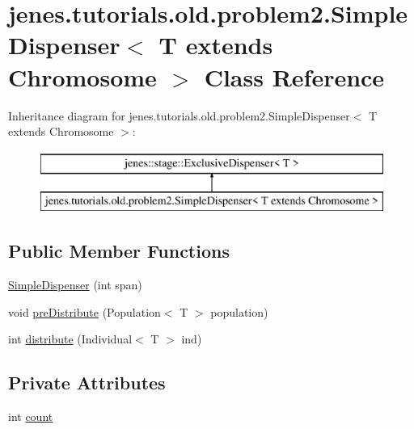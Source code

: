\hypertarget{classjenes_1_1tutorials_1_1old_1_1problem2_1_1_simple_dispenser_3_01_t_01extends_01_chromosome_01_4}{\section{jenes.\-tutorials.\-old.\-problem2.\-Simple\-Dispenser$<$ T extends Chromosome $>$ Class Reference}
\label{classjenes_1_1tutorials_1_1old_1_1problem2_1_1_simple_dispenser_3_01_t_01extends_01_chromosome_01_4}
}
Inheritance diagram for jenes.\-tutorials.\-old.\-problem2.\-Simple\-Dispenser$<$ T extends Chromosome $>$\-:\begin{figure}[H]
\begin{center}
\leavevmode
\includegraphics[height=2.000000cm]{classjenes_1_1tutorials_1_1old_1_1problem2_1_1_simple_dispenser_3_01_t_01extends_01_chromosome_01_4}
\end{center}
\end{figure}
\subsection*{Public Member Functions}
\begin{DoxyCompactItemize}
\item 
\hyperlink{classjenes_1_1tutorials_1_1old_1_1problem2_1_1_simple_dispenser_3_01_t_01extends_01_chromosome_01_4_ad9405ac409bd21e83c50f78472835da7}{Simple\-Dispenser} (int span)
\item 
void \hyperlink{classjenes_1_1tutorials_1_1old_1_1problem2_1_1_simple_dispenser_3_01_t_01extends_01_chromosome_01_4_a428636fd68143e1c24ea22bf626c290b}{pre\-Distribute} (Population$<$ T $>$ population)
\item 
int \hyperlink{classjenes_1_1tutorials_1_1old_1_1problem2_1_1_simple_dispenser_3_01_t_01extends_01_chromosome_01_4_a593230e918223c099f243524d3496783}{distribute} (Individual$<$ T $>$ ind)
\end{DoxyCompactItemize}
\subsection*{Private Attributes}
\begin{DoxyCompactItemize}
\item 
int \hyperlink{classjenes_1_1tutorials_1_1old_1_1problem2_1_1_simple_dispenser_3_01_t_01extends_01_chromosome_01_4_a5182803fa079af07b76c2e69f6af1cd6}{count}
\end{DoxyCompactItemize}


